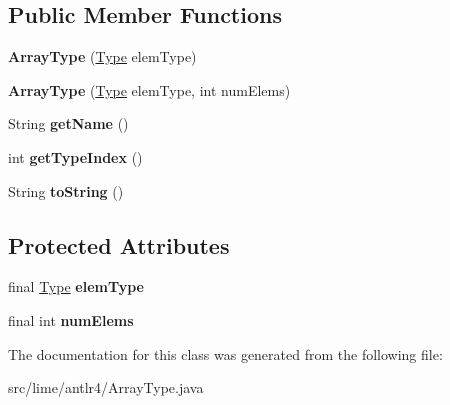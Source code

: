 \subsection*{Public Member Functions}
\begin{DoxyCompactItemize}
\item 
\mbox{\label{classlime_1_1antlr4_1_1ArrayType_afe6a490ca32c9b6d5798fcfaf231c7ff}} 
{\bfseries Array\+Type} (\hyperlink{interfacelime_1_1antlr4_1_1Type}{Type} elem\+Type)
\item 
\mbox{\label{classlime_1_1antlr4_1_1ArrayType_af36ad0edba10de016979212b51e2877d}} 
{\bfseries Array\+Type} (\hyperlink{interfacelime_1_1antlr4_1_1Type}{Type} elem\+Type, int num\+Elems)
\item 
\mbox{\label{classlime_1_1antlr4_1_1ArrayType_af14ca91720af7e3167b4eade114272ef}} 
String {\bfseries get\+Name} ()
\item 
\mbox{\label{classlime_1_1antlr4_1_1ArrayType_ad5346eef4f4d200839de637a6abb5828}} 
int {\bfseries get\+Type\+Index} ()
\item 
\mbox{\label{classlime_1_1antlr4_1_1ArrayType_ad18c4bf92630ebfe65c3b37e22ef0010}} 
String {\bfseries to\+String} ()
\end{DoxyCompactItemize}
\subsection*{Protected Attributes}
\begin{DoxyCompactItemize}
\item 
\mbox{\label{classlime_1_1antlr4_1_1ArrayType_acdf1025cc8bdc8fd500a5033310b192b}} 
final \hyperlink{interfacelime_1_1antlr4_1_1Type}{Type} {\bfseries elem\+Type}
\item 
\mbox{\label{classlime_1_1antlr4_1_1ArrayType_afd97729bd1d371c2a008608298abfd5f}} 
final int {\bfseries num\+Elems}
\end{DoxyCompactItemize}


The documentation for this class was generated from the following file\+:\begin{DoxyCompactItemize}
\item 
src/lime/antlr4/Array\+Type.\+java\end{DoxyCompactItemize}
